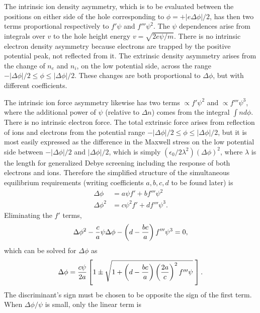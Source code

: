 \documentclass[pre]{revtex4-2}
\begin{document}
The intrinsic ion density asymmetry, which is to be evaluated between
the positions on either side of the hole corresponding to
$\phi=+|e\Delta \phi|/2$, has then two terms proportional respectively
to $f'\psi$ and $f'''\psi^2$. The $\psi$ dependences arise from
integrals over $v$ to the hole height energy
$v=\sqrt{2e\psi/m}$. There is no intrinsic electron density asymmetry
because electrons are trapped by the positive potential peak, not
reflected from it. The extrinsic density asymmetry arises from the
change of $n_e$ and $n_i$, on the low potential side, across the range
$-|\Delta\phi|/2 \le \phi \le |\Delta\phi|/2$. These changes are both
proportional to $\Delta\phi$, but with different coefficients.

The intrinsic ion force asymmetry likewise has two terms
$\propto f'\psi^2$ and $\propto f'''\psi^3$, where the additional
power of $\psi$ (relative to $\Delta n$) comes from the integral
$\int n d\phi$. There is no intrinsic electron force. The total
extrinsic force arises from reflection of ions and electrons from the
potential range $-|\Delta\phi|/2 \le \phi \le |\Delta\phi|/2$, but it
is most easily expressed as the difference in the Maxwell stress on
the low potential side between $-|\Delta\phi|/2$ and $|\Delta\phi|/2$,
which is simply $(\epsilon_0/2\lambda^2)(\Delta\phi)^2$, where
$\lambda$ is the length for generalized Debye screening including the
response of both electrons and ions. Therefore the simplified structure of the
simultaneous equilibrium requirements (writing coefficients
$a,b,c,d$ to be found later) is
\begin{equation}
  \label{eq:simul}
  \begin{split}
    \Delta\phi &= a \psi f'+ b f'''\psi^2\\
    \Delta\phi^2 &= c \psi^2f'+ d f'''\psi^3.
    \end{split}
\end{equation}
Eliminating the $f'$ terms,
\begin{equation}
  \label{eq:Delphieq}
  \Delta\phi^2-{c\over a}\psi\Delta\phi-
  \left(d- {bc\over a}\right) f''' \psi^3=0,
\end{equation}
which can be solved for $\Delta\phi$ as
\begin{equation}
  \label{eq:Dpsolve}
  \Delta\phi={c\psi\over 2 a}\left[1\pm\sqrt{1+ \left(d
    - {bc\over a}\right)\left(2a\over c\right)^2f'''\psi}\;\right]
  .
\end{equation}
The discriminant's sign must be chosen to be opposite the sign of the
first term.  When $\Delta\phi/\psi$ is small, only the linear term is
\end{document}

